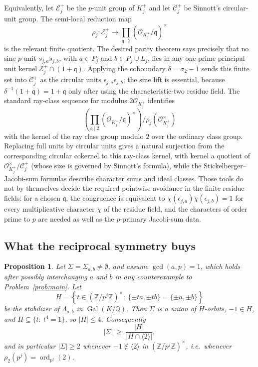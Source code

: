 \documentclass[a4paper]{article}
\newtheorem{proposition}[theorem]{Proposition}
\newcommand{\Z}{\mathbb{Z}}
\newcommand{\Q}{\mathbb{Q}}
\newcommand{\ord}[2][]{\operatorname{ord}_{#1}\!\left(#2\right)}
\newcommand{\abs}[1]{\left|#1\right|}
\DeclareMathOperator{\Gal}{Gal}
\begin{document}
Equivalently, let $\mathcal E_j^+$ be the $p$-unit group of $K_j^+$ and
let $\mathcal C_j^+$ be Sinnott's circular-unit group.  The semi-local
reduction map
\[
	\rho_j:\mathcal E_j^+\longrightarrow
	\prod_{\mathfrak q\mid2}
		(\mathcal O_{K_j^+}/\mathfrak q)^\times
\]
is the relevant finite quotient.  The desired parity theorem says precisely that
no sine $p$-unit $s_{j,a}s_{j,b}$, with $a\in P_j$ and
$b\in P_j\cup L_j$, lies in any one-prime principal-unit kernel
$\mathcal E_j^+\cap(1+\mathfrak q)$.  Applying the coboundary
$\delta=\sigma_2-1$ sends this finite set into
$\mathcal C_j^+$ as the circular units
$\epsilon_{j,a}\epsilon_{j,b}$; the sine lift is essential, because
$\delta^{-1}(1+\mathfrak q)=1+\mathfrak q$ only after using the
characteristic-two residue field.  The standard ray-class sequence
for modulus $2\mathcal O_{K_j^+}$ identifies
\[
	\left(\prod_{\mathfrak q\mid2}
		(\mathcal O_{K_j^+}/\mathfrak q)^\times\right)\big/
	\rho_j(\mathcal O_{K_j^+}^{\times})
\]
with the kernel of the ray class group modulo $2$ over the ordinary class
group.  Replacing full units by circular units gives a natural
surjection from the corresponding circular cokernel to this ray-class
kernel, with kernel a quotient of
$\mathcal O_{K_j^+}^{\times}/\mathcal C_j^+$ (whose size is governed by
Sinnott's formula), while the
Stickelberger--Jacobi-sum formulas describe character sums and ideal
classes.  Those tools do not by themselves decide the required pointwise
avoidance in the finite residue fields: for a chosen
$\mathfrak q$, the congruence is equivalent to
$\chi(\epsilon_{j,a})\chi(\epsilon_{j,b})=1$ for every multiplicative
character $\chi$ of the residue field, and the characters of order
prime to $p$ are needed as well as the $p$-primary Jacobi-sum data.

\subsection{What the reciprocal symmetry buys}

\begin{proposition}\label{prop:sigma}
	Let $\Sigma=\Sigma_{a,b}\ne\emptyset$, and assume $\gcd(a,p)=1$, which
	holds after possibly interchanging $a$ and $b$ in any counterexample to
	Problem~\ref{prob:main}.
	Let
	\[
		H=\left\{t\in(\Z/p^j\Z)^{\times}:\ \{\pm ta,\pm tb\}=\{\pm a,\pm b\}\right\}
	\]
	be the stabilizer of $\Lambda_{a,b}$ in $\Gal(K/\Q)$.
	Then $\Sigma$ is a union of $H$-orbits, $-1\in H$, and
	$H\subseteq\{t:\ t^{4}=1\}$, so $\abs{H}\leq4$.
	Consequently
	\[
		\abs{\Sigma}\ \geq\ \frac{\abs{H}}{\abs{H\cap\langle2\rangle}},
	\]
	and in particular $\abs{\Sigma}\geq2$ whenever
	$-1\notin\langle2\rangle$ in $(\Z/p^j\Z)^{\times}$, i.e.\ whenever
	$\rho_2(p^j)=\ord[p^j]{2}$.
\end{proposition}
\end{document}
